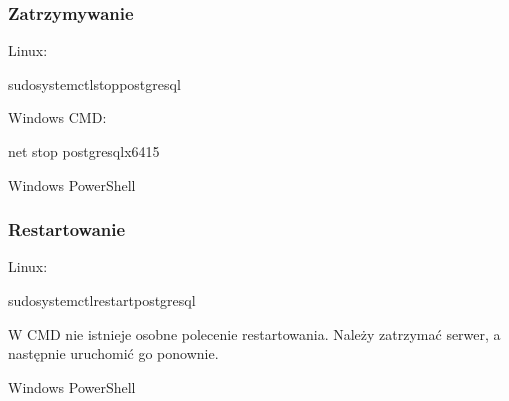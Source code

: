 \documentclass[a4paper,11pt,openany,english]{sphinxmanual}
\begin{document}
\subsubsection{Zatrzymywanie}
\label{\detokenize{rozdzial2/Kontrola_i_konserwacja/kontrola_i_konserwacja:zatrzymywanie}}
\sphinxAtStartPar
Linux:

\begin{sphinxVerbatim}[commandchars=\\\{\}]
sudosystemctlstoppostgresql
\end{sphinxVerbatim}

\sphinxAtStartPar
Windows CMD:

\begin{sphinxVerbatim}[commandchars=\\\{\}]
net stop postgresql\PYGZhy{}x64\PYGZhy{}15
\end{sphinxVerbatim}

\sphinxAtStartPar
Windows PowerShell

\begin{sphinxVerbatim}[commandchars=\\\{\}]
  
\end{sphinxVerbatim}


\subsubsection{Restartowanie}
\label{\detokenize{rozdzial2/Kontrola_i_konserwacja/kontrola_i_konserwacja:restartowanie}}
\sphinxAtStartPar
Linux:

\begin{sphinxVerbatim}[commandchars=\\\{\}]
sudosystemctlrestartpostgresql
\end{sphinxVerbatim}

\sphinxAtStartPar
W CMD nie istnieje osobne polecenie restartowania. Należy zatrzymać serwer, a następnie uruchomić go ponownie.

\sphinxAtStartPar
Windows PowerShell

\begin{sphinxVerbatim}[commandchars=\\\{\}]
  
\end{sphinxVerbatim}
\end{document}
